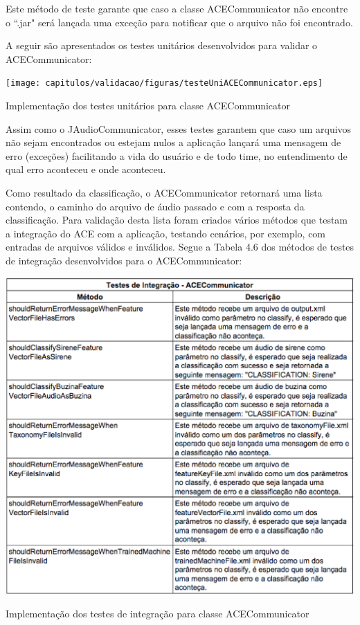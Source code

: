 \begin{itemize}
Este método de teste garante que caso a classe ACECommunicator não encontre o ``.jar" será lançada uma exceção para notificar que o arquivo não foi encontrado.

A seguir são apresentados os testes unitários desenvolvidos para validar o ACECommunicator:

\begin{table}[H]
	\centering
	\captionsetup{justification=centering,margin=2cm}
	\texttt{[image: capitulos/validacao/figuras/testeUniACECommunicator.eps]}
	\caption{Implementação dos testes unitários para classe ACECommunicator}
	\label{fig:result-engajamento}
\end{table}

Assim como o JAudioCommunicator, esses testes garantem que caso um  arquivos não sejam encontrados ou estejam nulos a aplicação lançará uma mensagem de erro (exceções) facilitando a vida do usuário e de todo time, no entendimento de qual erro aconteceu e onde aconteceu.

Como resultado da classificação, o ACECommunicator retornará uma lista contendo, o caminho do arquivo de áudio passado e com a resposta da classificação. Para validação desta lista foram criados vários métodos que testam a integração do ACE com a aplicação, testando cenários, por exemplo, com entradas de arquivos válidos e inválidos. Segue a Tabela 4.6 dos métodos de testes de integração desenvolvidos para o ACECommunicator:

\begin{table}[H]
	\centering
	\captionsetup{justification=centering,margin=2cm}
	\includegraphics[scale=0.65]{capitulos/validacao/figuras/testesIntegracaoACECommunicator.eps}
	\caption{Implementação dos testes de integração para classe ACECommunicator}
	\label{fig:result-engajamento}
\end{table}


\end{itemize}
